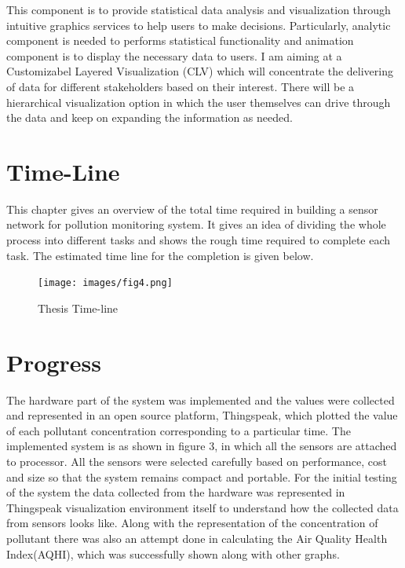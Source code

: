 \documentclass[11pt]{article}
\begin{document}
This component is to provide statistical data analysis and visualization through intuitive graphics services to help users to make decisions. Particularly, analytic component is needed to performs statistical functionality and animation component is to display the necessary data to users. I am aiming at a Customizabel Layered Visualization (CLV) which will concentrate the delivering of data for different stakeholders based on their interest. There will be a hierarchical visualization option in which the user themselves can drive through the data and keep on expanding the information as needed.
\newpage

\section{Time-Line}

This chapter gives an overview of the total time required in building a sensor network for pollution monitoring system. It gives an idea of dividing the whole process into different tasks and shows the rough time required to complete each task. The estimated time line for the completion is given below.





\begin{figure}[h!]
  \centering
  \hspace*{-1.40cm}   
\texttt{[image: images/fig4.png]}
  \hspace*{-1.40cm}
  \caption{Thesis Time-line}
  \label{arch}
\end{figure}
\newpage
\section{Progress}

The hardware part of the system was implemented and the values were collected and represented in an open source platform, Thingspeak, which plotted the value of each pollutant concentration corresponding to a particular time. The implemented system is as shown in figure 3, in which all the sensors are attached to processor. All the sensors were selected carefully based on performance, cost and size so that the system remains compact and portable. For the initial testing of the system the data collected from the hardware was represented in Thingspeak visualization environment itself to understand how the collected data from sensors looks like. Along with the representation of the concentration of pollutant there was also an attempt done in calculating the Air Quality Health Index(AQHI), which was successfully shown along with other graphs. 
\end{document}
